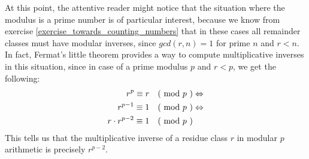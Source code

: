 At this point, the attentive reader might notice that the situation where the modulus is a prime number is of particular interest, because we know from exercise \ref{exercise_towards_counting_numbers} that in these cases all remainder classes must have modular inverses, since $gcd(r,n)=1$ for prime $n$ and $r<n$. In fact, Fermat's little theorem provides a way to compute multiplicative inverses in this situation, since in case of a prime modulus $p$ and $r<p$, we get the following:
\begin{align*}
r^p \equiv r \quad \text{( mod } p \text{ )} & \Leftrightarrow \\
r^{p-1} \equiv 1 \quad \text{( mod } p \text{ )} & \Leftrightarrow \\
r\cdot r^{p-2} \equiv 1 \quad \text{( mod } p \text{ )}
\end{align*}
This tells us that the multiplicative inverse of a residue class $r$ in modular $p$ arithmetic is precisely $r^{p-2}$.
